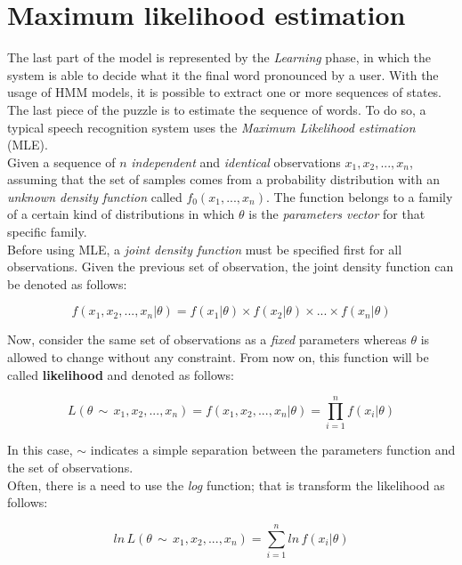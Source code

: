 \section{Maximum likelihood estimation}
\label{sec:mle}
The last part of the model is represented by the \textit{Learning} phase, in which the system is able to decide what it the final word pronounced by a user. With the usage of HMM models, it is possible to extract one or more sequences of states. The last piece of the puzzle is to estimate the sequence of words. To do so, a typical speech recognition system uses the \textit{Maximum Likelihood estimation} (MLE). \\

\noindent Given a sequence of $n$ \textit{independent} and \textit{identical} observations $x_{1}, x_{2}, ... , x_{n}$, assuming that the set of samples comes from a probability distribution with an \textit{unknown density function} called $f_{0}(x_{1}, ... , x_{n})$. The function belongs to a family of a certain kind of distributions in which $\theta$ is the \textit{parameters vector} for that specific family. \\

\noindent Before using MLE, a \textit{joint density function} must be specified first for all observations. Given the previous set of observation, the joint density function can be denoted as follows:

\begin{equation}
	f (x_{1}, x_{2}, ... , x_{n} | \theta) = f(x_{1} | \theta) \times f(x_{2} | \theta) \times ... \times f(x_{n} | \theta)
\end{equation}

\noindent Now, consider the same set of observations as a \textit{fixed} parameters whereas $\theta$ is allowed to change without any constraint. From now on, this function will be called \textbf{likelihood} and denoted as follows:

\begin{equation}
	L(\theta \, \sim \, x_{1}, x_{2}, ... , x_{n}) = f (x_{1}, x_{2}, ... , x_{n} | \theta) = \prod_{i=1}^{n} f (x_{i} | \theta)
\end{equation}

\noindent In this case, $\sim$ indicates a simple separation between the parameters function and the set of observations. \\
\noindent Often, there is a need to use the \textit{log} function; that is transform the likelihood as follows:

\begin{equation}
\label{eq:log-likelihood}
	ln \, L(\theta \, \sim \, x_{1}, x_{2}, ... , x_{n}) = \sum_{i=1}^{n} ln \, f(x_{i} | \theta)
\end{equation}

